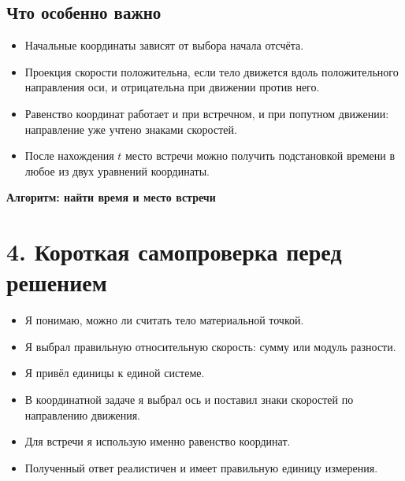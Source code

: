 \documentclass[a4paper,12pt]{article}
\newcommand{\sectionline}{\par\vspace{2mm}{\color{accent}\hrule height 0.7pt}\vspace{3mm}}
\newcommand{\checkitem}[1]{\item[$\square$] #1}
\begin{document}
\subsection*{Что особенно важно}
\begin{itemize}
\item Начальные координаты зависят от выбора начала отсчёта.
\item Проекция скорости положительна, если тело движется вдоль положительного направления оси, и отрицательна при движении против него.
\item Равенство координат работает и при встречном, и при попутном движении: направление уже учтено знаками скоростей.
\item После нахождения \(t\) место встречи можно получить подстановкой времени в любое из двух уравнений координаты.
\end{itemize}

\clearpage
\thispagestyle{fancy}
\begin{center}
{\Large\bfseries\color{accent} Алгоритм: найти время и место встречи}
\end{center}
\vspace{9mm}
\clearpage

\section*{4. Короткая самопроверка перед решением}
\sectionline
\begin{itemize}
\checkitem{Я понимаю, можно ли считать тело материальной точкой.}
\checkitem{Я выбрал правильную относительную скорость: сумму или модуль разности.}
\checkitem{Я привёл единицы к единой системе.}
\checkitem{В координатной задаче я выбрал ось и поставил знаки скоростей по направлению движения.}
\checkitem{Для встречи я использую именно равенство координат.}
\checkitem{Полученный ответ реалистичен и имеет правильную единицу измерения.}
\end{itemize}
\end{document}
